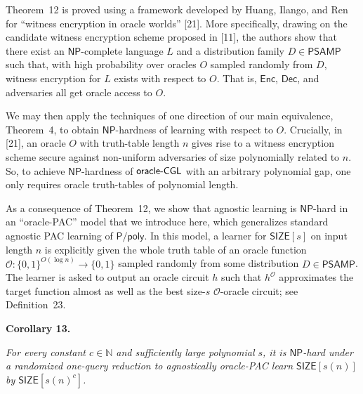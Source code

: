 \documentclass[10pt,a4paper]{article}
\begin{document}



Theorem 12 is proved using a framework developed by Huang, Ilango, and Ren for “witness encryption in oracle worlds” [21]. More specifically, drawing on the candidate witness encryption scheme proposed in [11], the authors show that there exist an ${\mathsf{NP}}$-complete language $L$ and a distribution family $D\in{\mathsf{P}}{\mathsf{SAMP}}$ such that, with high probability over oracles $O$ sampled randomly from $D$, witness encryption for $L$ exists with respect to $O$. That is, ${\mathsf{Enc}}$, ${\mathsf{Dec}}$, and adversaries all get oracle access to $O$.\par




We may then apply the techniques of one direction of our main equivalence, Theorem 4, to obtain ${\mathsf{NP}}$-hardness of learning with respect to $O$. Crucially, in [21], an oracle $O$ with truth-table length $n$ gives rise to a witness encryption scheme secure against non-uniform adversaries of size polynomially related to $n$. So, to achieve ${\mathsf{NP}}$-hardness of ${\sf oracle}\text{-}{\sf CGL}$ with an arbitrary polynomial gap, one only requires oracle truth-tables of polynomial length.\par




As a consequence of Theorem 12, we show that agnostic learning is ${\mathsf{NP}}$-hard in an “oracle-PAC” model that we introduce here, which generalizes standard agnostic PAC learning of ${\mathsf{P}}/{\mathsf{poly}}$. In this model, a learner for ${\mathsf{SIZE}}[s]$ on input length $n$ is explicitly given the whole truth table of an oracle function $\mathcal{O}:\{0,1\}^{O(\log n)}\to\{0,1\}$ sampled randomly from some distribution $D\in{\mathsf{P}}{\mathsf{SAMP}}$. The learner is asked to output an oracle circuit $h$ such that $h^{\mathcal{O}}$ approximates the target function almost as well as the best size-$s$ $\mathcal{O}$-oracle circuit; see Definition 23.\par





\par\medskip\noindent\textbf{
\textbf{Corollary 13}\textbf{.}
}\par



\emph{For every constant $c\in\mathbb{N}$ and sufficiently large polynomial $s$, it is ${\mathsf{NP}}$-hard under a randomized one-query reduction to agnostically oracle-PAC learn ${\mathsf{SIZE}}[s(n)]$ by ${\mathsf{SIZE}}[s(n)^{c}]$.}\par
\end{document}
